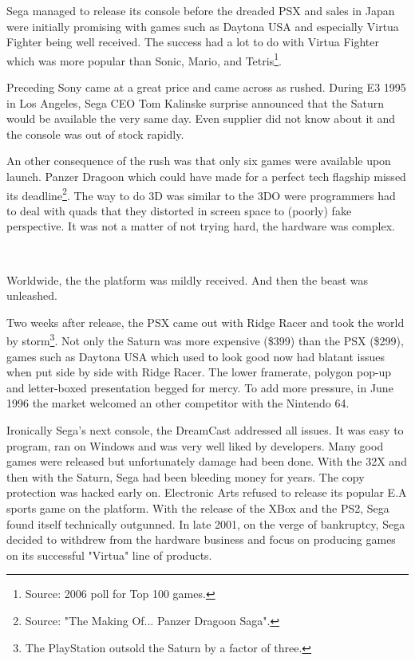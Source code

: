 \par
Sega managed to release its console before the dreaded PSX and sales in Japan were initially promising with games such as Daytona USA and especially Virtua Fighter being well received. The success had a lot to do with Virtua Fighter which was more popular than Sonic, Mario, and Tetris\footnote{Source: 2006 poll for Top 100 games.}.\\
\par
Preceding Sony came at a great price and came across as rushed. During E3 1995 in Los Angeles, Sega CEO Tom Kalinske surprise announced that the Saturn would be available the very same day. Even supplier did not know about it and the console was out of stock rapidly.\\  
\par
An other consequence of the rush was that only six games were available upon launch. Panzer Dragoon which could have made for a perfect tech flagship missed its deadline\footnote{Source: "The Making Of... Panzer Dragoon Saga".}. The way to do 3D was similar to the 3DO were programmers had to deal with quads that they distorted in screen space to (poorly) fake perspective. It was not a matter of not trying hard, the hardware was complex.\\
\par
{}\\
\par
Worldwide, the the platform was mildly received. And then the beast was unleashed.\\
\par
 Two weeks after release, the PSX came out with Ridge Racer and took the world by storm\footnote{The PlayStation outsold the Saturn by a factor of three.}. Not only the Saturn was more expensive (\$399) than the PSX (\$299), games such as Daytona USA which used to look good now had blatant issues when put side by side with Ridge Racer. The lower framerate, polygon pop-up and letter-boxed presentation begged for mercy. To add more pressure, in June 1996 the market welcomed an other competitor with the Nintendo 64.\\
\par
Ironically Sega's next console, the DreamCast addressed all issues. It was easy to program, ran on Windows and was very well liked by developers. Many good games were released but unfortunately damage had been done. With the 32X and then with the Saturn, Sega had been bleeding money for years. The copy protection was hacked early on. Electronic Arts refused to release its popular E.A sports game on the platform. With the release of the XBox and the PS2, Sega found itself technically outgunned. In late 2001, on the verge of bankruptcy, Sega decided to withdrew from the hardware business and focus on producing games on its successful "Virtua" line of products.








